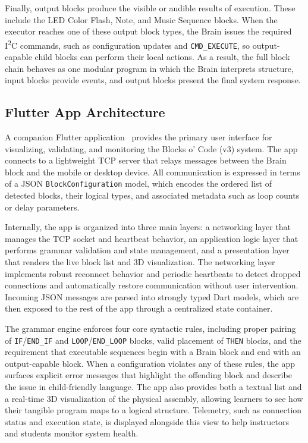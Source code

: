 \documentclass[10pt, conference]{IEEEtran}
\begin{document}
Finally, output blocks produce the visible or audible results of execution. These include the LED Color Flash, Note, and Music Sequence blocks. When the executor reaches one of these output block types, the Brain issues the required I\textsuperscript{2}C commands, such as configuration updates and \texttt{CMD\_EXECUTE}, so output-capable child blocks can perform their local actions. As a result, the full block chain behaves as one modular program in which 
the Brain interprets structure, input blocks provide events, and output blocks present the final system response.

\subsection{Flutter App Architecture}
A companion Flutter application~\cite{flutter} provides the primary user interface for visualizing, validating, and monitoring the Blocks o' Code (v3) system. The app connects to a lightweight TCP server that relays messages between the Brain block and the mobile or desktop device. All communication is expressed in terms of a JSON \texttt{BlockConfiguration} model, which encodes the ordered list of detected blocks, their logical types, and associated metadata such as loop counts or delay parameters.

Internally, the app is organized into three main layers: a networking layer that manages the TCP socket and heartbeat behavior, an application logic layer that performs grammar validation and state management, and a presentation layer that renders the live block list and 3D visualization. The networking layer implements robust reconnect behavior and periodic heartbeats to detect dropped connections and automatically restore communication without user intervention. Incoming JSON messages are parsed into strongly typed Dart models, which are then exposed to the rest of the app through a centralized state container.

The grammar engine enforces four core syntactic rules, including proper pairing of \texttt{IF}/\texttt{END\_IF} and \texttt{LOOP}/\texttt{END\_LOOP} blocks, valid placement of \texttt{THEN} blocks, and the requirement that executable sequences begin with a Brain block and end with an output-capable block. When a configuration violates any of these rules, the app surfaces explicit error messages that highlight the offending block and describe the issue in child-friendly language. The app also provides both a textual list and a real-time 3D visualization of the physical assembly, allowing learners to see how their tangible program maps to a logical structure. Telemetry, such as connection status and execution state, is displayed alongside this view to help instructors and students monitor system health.
\end{document}

